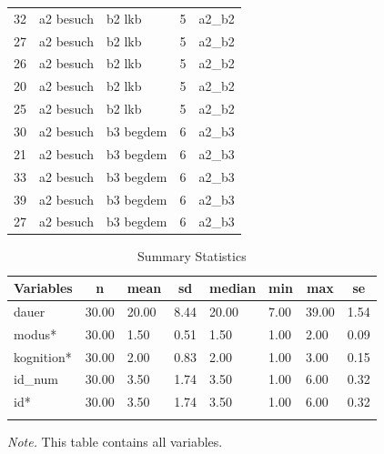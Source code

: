 \documentclass[
  doc,floatsintext]{apa6}
\begin{document}
\begin{table}[tbp]
\begin{center}
\begin{threeparttable}
\begin{tabular}{lllll}
32 & a2 besuch & b2 lkb & 5 & a2\_b2\\
27 & a2 besuch & b2 lkb & 5 & a2\_b2\\
26 & a2 besuch & b2 lkb & 5 & a2\_b2\\
20 & a2 besuch & b2 lkb & 5 & a2\_b2\\
25 & a2 besuch & b2 lkb & 5 & a2\_b2\\
30 & a2 besuch & b3 begdem & 6 & a2\_b3\\
21 & a2 besuch & b3 begdem & 6 & a2\_b3\\
33 & a2 besuch & b3 begdem & 6 & a2\_b3\\
39 & a2 besuch & b3 begdem & 6 & a2\_b3\\
27 & a2 besuch & b3 begdem & 6 & a2\_b3\\
\bottomrule
\end{tabular}

\end{threeparttable}
\end{center}

\end{table}

\begin{table}[tbp]

\begin{center}
\begin{threeparttable}

\caption{\label{tab:tabsumstat}Summary Statistics}

\begin{tabular}{llllllll}
\toprule
Variables & \multicolumn{1}{c}{n} & \multicolumn{1}{c}{mean} & \multicolumn{1}{c}{sd} & \multicolumn{1}{c}{median} & \multicolumn{1}{c}{min} & \multicolumn{1}{c}{max} & \multicolumn{1}{c}{se}\\
\midrule
dauer & 30.00 & 20.00 & 8.44 & 20.00 & 7.00 & 39.00 & 1.54\\
modus* & 30.00 & 1.50 & 0.51 & 1.50 & 1.00 & 2.00 & 0.09\\
kognition* & 30.00 & 2.00 & 0.83 & 2.00 & 1.00 & 3.00 & 0.15\\
id\_num & 30.00 & 3.50 & 1.74 & 3.50 & 1.00 & 6.00 & 0.32\\
id* & 30.00 & 3.50 & 1.74 & 3.50 & 1.00 & 6.00 & 0.32\\
\bottomrule
\addlinespace
\end{tabular}

\begin{tablenotes}[para]
\normalsize{\textit{Note.} This table contains all variables.}
\end{tablenotes}

\end{threeparttable}
\end{center}

\end{table}
\end{document}
